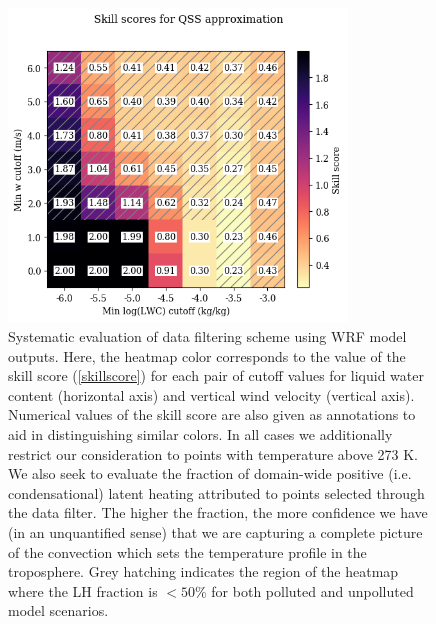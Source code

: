 \documentclass{article}
\begin{document}
\begin{figure}[ht]
    \centering
    \includegraphics[width=9cm]{wrf/filtering_criteria_figure.png}
    \caption{Systematic evaluation of data filtering scheme using WRF model outputs. Here, the heatmap color corresponds to the value of the skill score (\ref{skillscore}) for each pair of cutoff values for liquid water content (horizontal axis) and vertical wind velocity (vertical axis). Numerical values of the skill score are also given as annotations to aid in distinguishing similar colors. In all cases we additionally restrict our consideration to points with temperature above 273 K. We also seek to evaluate the fraction of domain-wide positive (i.e. condensational) latent heating attributed to points selected through the data filter. The higher the fraction, the more confidence we have (in an unquantified sense) that we are capturing a complete picture of the convection which sets the temperature profile in the troposphere. Grey hatching indicates the region of the heatmap where the LH fraction is $< 50\%$ for both polluted and unpolluted model scenarios.}
    \label{filtcritheatmap}
\end{figure}
\end{document}
